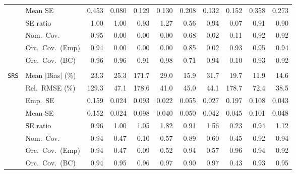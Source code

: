\begin{landscape}
\begin{longtable}{llrrrrrrrrr}
 & Mean SE & 0.453 & 0.080 & 0.129 & 0.130 & 0.208 & 0.132 & 0.152 & 0.358 & 0.273 \\
 & SE ratio & \cellcolor{rankone}1.00 & \cellcolor{rankone}1.00 & \cellcolor{rankthree}0.93 & 1.27 & 0.56 & \cellcolor{ranktwo}0.94 & 0.07 & 0.91 & 0.90 \\
 & Nom.\ Cov. & \cellcolor{rankone}0.95 & 0.00 & 0.00 & 0.00 & \cellcolor{rankthree}0.68 & 0.02 & 0.11 & \cellcolor{ranktwo}0.92 & \cellcolor{ranktwo}0.92 \\
 & Orc.\ Cov.\ (Emp) & \cellcolor{ranktwo}0.94 & 0.00 & 0.00 & 0.00 & 0.85 & 0.02 & \cellcolor{rankthree}0.93 & \cellcolor{rankone}0.95 & \cellcolor{ranktwo}0.94 \\
 & Orc.\ Cov.\ (BC) & \cellcolor{rankone}0.96 & \cellcolor{rankone}0.96 & 0.91 & \cellcolor{rankthree}0.98 & 0.71 & \cellcolor{rankone}0.94 & 0.10 & \cellcolor{ranktwo}0.93 & \cellcolor{rankthree}0.92 \\
\addlinespace[2pt]
\multicolumn{11}{l}{\textbf{Continuous Phase-One Covariates}} \\
\addlinespace[2pt]
\quad \texttt{SRS} & Mean $|$Bias$|$ (\%) & 23.3 & 25.3 & 171.7 & 29.0 & \cellcolor{rankthree}15.9 & 31.7 & 19.7 & \cellcolor{rankone}11.9 & \cellcolor{ranktwo}14.6 \\
 & Rel.\ RMSE (\%) & 129.3 & 47.1 & 178.6 & \cellcolor{ranktwo}41.0 & 45.0 & \cellcolor{rankthree}44.1 & 178.7 & 72.4 & \cellcolor{rankone}38.5 \\
 & Emp.\ SE & 0.159 & 0.024 & 0.093 & 0.022 & 0.055 & 0.027 & 0.197 & 0.108 & 0.043 \\
 & Mean SE & 0.152 & 0.024 & 0.098 & 0.040 & 0.050 & 0.042 & 0.045 & 0.101 & 0.048 \\
 & SE ratio & \cellcolor{ranktwo}0.96 & \cellcolor{rankone}1.00 & \cellcolor{rankthree}1.05 & 1.82 & 0.91 & 1.56 & 0.23 & 0.94 & 1.12 \\
 & Nom.\ Cov. & \cellcolor{rankone}0.94 & 0.47 & 0.10 & 0.57 & \cellcolor{rankthree}0.89 & 0.60 & 0.45 & \cellcolor{ranktwo}0.92 & \cellcolor{rankone}0.94 \\
 & Orc.\ Cov.\ (Emp) & \cellcolor{rankone}0.94 & 0.47 & 0.09 & 0.52 & \cellcolor{rankone}0.94 & \cellcolor{rankthree}0.57 & \cellcolor{rankone}0.96 & \cellcolor{rankone}0.94 & \cellcolor{ranktwo}0.92 \\
 & Orc.\ Cov.\ (BC) & \cellcolor{ranktwo}0.94 & \cellcolor{ranktwo}0.95 & \cellcolor{ranktwo}0.96 & \cellcolor{rankthree}0.97 & 0.90 & 0.97 & 0.43 & \cellcolor{rankthree}0.93 & \cellcolor{rankone}0.95 \\

\end{longtable}
\end{landscape}
